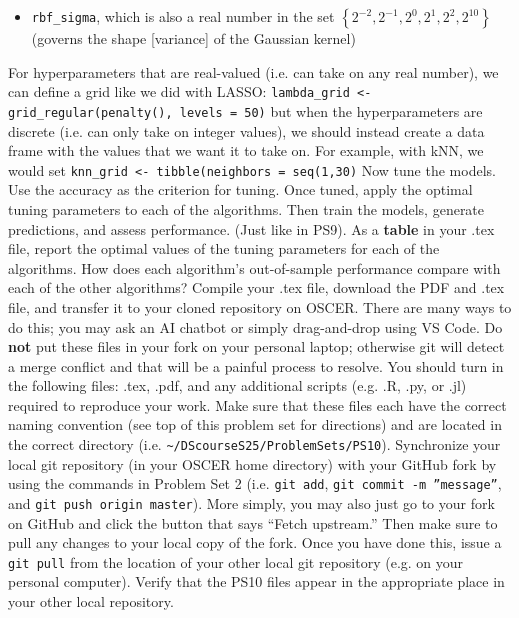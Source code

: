\documentclass[12pt,english]{exam}
\begin{document}
\begin{questions}
\begin{itemize}
\begin{itemize}
    \item \texttt{rbf\_sigma}, which is also a real number in the set $\left\{2^{-2},2^{-1},2^{0},2^{1},2^{2},2^{10}\right\}$ (governs the shape [variance] of the Gaussian kernel) 
    \end{itemize}
\end{itemize}
For hyperparameters that are real-valued (i.e. can take on any real number), we can define a grid like we did with LASSO:
\texttt{lambda\_grid <- grid\_regular(penalty(), levels = 50)}
\bigskip
but when the hyperparameters are discrete (i.e. can only take on integer values), we should instead create a data frame with the values that we want it to take on. For example, with kNN, we would set
\texttt{knn\_grid <- tibble(neighbors = seq(1,30)}
\question Now tune the models. Use the accuracy as the criterion for tuning. %
\question Once tuned, apply the optimal tuning parameters to each of the algorithms. Then train the models, generate predictions, and assess performance. (Just like in PS9).
\question As a \textbf{table} in your .tex file, report the optimal values of the tuning parameters for each of the algorithms. How does each algorithm's out-of-sample performance compare with each of the other algorithms?
\question Compile your .tex file, download the PDF and .tex file, and transfer it to your cloned repository on OSCER. There are many ways to do this;  you may ask an AI chatbot or simply drag-and-drop using VS Code. Do \textbf{not} put these files in your fork on your personal laptop; otherwise git will detect a merge conflict and that will be a painful process to resolve.
\question You should turn in the following files: .tex, .pdf, and any additional scripts (e.g. .R, .py, or .jl) required to reproduce your work.  Make sure that these files each have the correct naming convention (see top of this problem set for directions) and are located in the correct directory (i.e. \texttt{\textasciitilde/DScourseS25/ProblemSets/PS10}).
\question Synchronize your local git repository (in your OSCER home directory) with your GitHub fork by using the commands in Problem Set 2 (i.e. \texttt{git add}, \texttt{git commit -m ''message''}, and \texttt{git push origin master}). More simply, you may also just go to your fork on GitHub and click the button that says ``Fetch upstream.'' Then make sure to pull any changes to your local copy of the fork. Once you have done this, issue a \texttt{git pull} from the location of your other local git repository (e.g. on your personal computer). Verify that the PS10 files appear in the appropriate place in your other local repository.
\end{questions}
\end{document}
